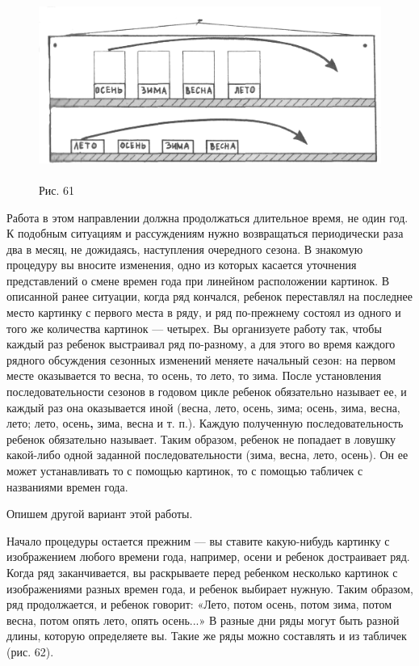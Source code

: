 \documentclass{book}
\begin{document}
\begin{figure}
\centering
\includegraphics[width=4.96667in,height=2.42014in]{media/media/image58.jpg}
\caption*{Рис. 61}
\end{figure}

Работа в этом направлении должна продолжаться длительное время, не один
год. К подобным ситуациям и рассуждениям нужно возвращаться периодически
раза два в месяц, не дожидаясь, наступления очередного сезона. В
знакомую процедуру вы вносите изменения, одно из которых касается
уточнения представлений о смене времен года при линейном расположении
картинок. В описанной ранее ситуации, когда ряд кончался, ребенок
переставлял на последнее место картинку с первого места в ряду, и ряд
по-прежнему состоял из одного и того же количества картинок --- четырех.
Вы организуете работу так, чтобы каждый раз ребенок выстраивал ряд
по-разному, а для этого во время каждого рядного обсуждения сезонных
изменений меняете начальный сезон: на первом месте оказывается то весна,
то осень, то лето, то зима. После установления последовательности
сезонов в годовом цикле ребенок обязательно называет ее, и каждый раз
она оказывается иной (весна, лето, осень, зима; осень, зима, весна,
лето; лето, осень\textbf{,} зима, весна и т. п.). Каждую полученную
последовательность ребенок обязательно называет. Таким образом, ребенок
не попадает в ловушку какой-либо одной заданной последовательности
(зима, весна, лето, осень). Он ее может устанавливать то с помощью
картинок, то с помощью табличек с названиями времен года.

Опишем другой вариант этой работы.

Начало процедуры остается прежним --- вы ставите какую-нибудь картинку с
изображением любого времени года, например, осени и ребенок достраивает
ряд. Когда ряд заканчивается, вы раскрываете перед ребенком несколько
картинок с изображениями разных времен года, и ребенок выбирает нужную.
Таким образом, ряд продолжается, и ребенок говорит: «Лето, потом осень,
потом зима, потом весна, потом опять лето, опять осень...» В разные дни
ряды могут быть разной длины, которую определяете вы. Такие же ряды
можно составлять и из табличек (рис. 62).
\end{document}
